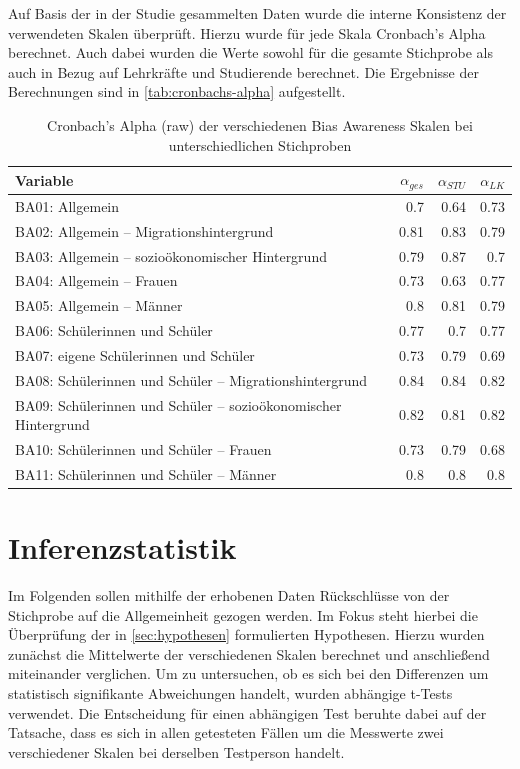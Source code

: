 Auf Basis der in der Studie gesammelten Daten wurde die interne Konsistenz der verwendeten Skalen überprüft.
Hierzu wurde für jede Skala Cronbach's Alpha berechnet.
Auch dabei wurden die Werte sowohl für die gesamte Stichprobe als auch in Bezug auf Lehrkräfte und Studierende berechnet.
Die Ergebnisse der Berechnungen sind in \autoref{tab:cronbachs-alpha} aufgestellt.

\begin{table}[h!]
	\begin{tabularx}{\textwidth}{X | r | r | r}
		\hline
		Variable & \textbf{$\alpha_{ges}$} & \textbf{$\alpha_{STU}$} & \textbf{$\alpha_{LK}$}\\
		\hline
		BA01: Allgemein & 0.7 & 0.64 & 0.73\\
		BA02: Allgemein -- Migrationshintergrund & 0.81 & 0.83 & 0.79\\
		BA03: Allgemein -- sozioökonomischer Hintergrund & 0.79 & 0.87 & 0.7\\
		BA04: Allgemein -- Frauen & 0.73 & 0.63 & 0.77\\
		BA05: Allgemein -- Männer & 0.8 & 0.81 & 0.79\\
		BA06: Schülerinnen und Schüler & 0.77 & 0.7 & 0.77\\
		BA07: eigene Schülerinnen und Schüler & 0.73 & 0.79 & 0.69\\
		BA08: Schülerinnen und Schüler -- Migrationshintergrund & 0.84 & 0.84 & 0.82\\
		BA09: Schülerinnen und Schüler -- sozioökonomischer Hintergrund & 0.82 & 0.81 & 0.82\\
		BA10: Schülerinnen und Schüler -- Frauen & 0.73 & 0.79 & 0.68\\
		BA11: Schülerinnen und Schüler -- Männer & 0.8 & 0.8 & 0.8\\
		\hline
	\end{tabularx}
	\caption{Cronbach's Alpha (raw) der verschiedenen Bias Awareness Skalen bei unterschiedlichen Stichproben}
	\label{tab:cronbachs-alpha}
\end{table}


\section{Inferenzstatistik}
\label{sec:inferenzstatistik}

Im Folgenden sollen mithilfe der erhobenen Daten Rückschlüsse von der Stichprobe auf die Allgemeinheit gezogen werden.
Im Fokus steht hierbei die Überprüfung der in \autoref{sec:hypothesen} formulierten Hypothesen.
Hierzu wurden zunächst die Mittelwerte der verschiedenen Skalen berechnet und anschließend miteinander verglichen.
Um zu untersuchen, ob es sich bei den Differenzen um statistisch signifikante Abweichungen handelt, wurden abhängige t-Tests verwendet.
Die Entscheidung für einen abhängigen Test beruhte dabei auf der Tatsache, dass es sich in allen getesteten Fällen um die Messwerte zwei verschiedener Skalen bei derselben Testperson handelt.

